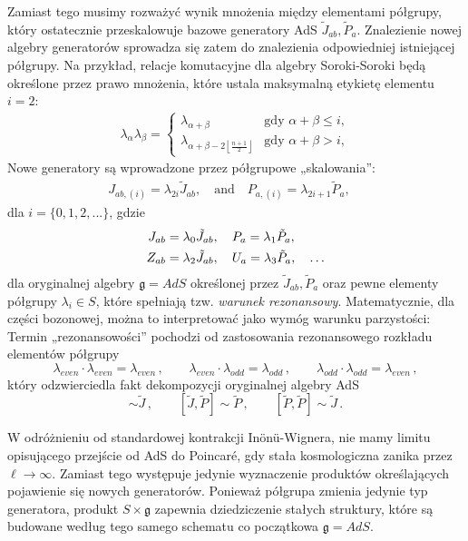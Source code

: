 \documentclass[12pt,a4paper]{article}
\begin{document}
Zamiast tego musimy rozważyć wynik mnożenia między elementami półgrupy, który ostatecznie przeskalowuje bazowe generatory AdS $\tilde{J}_{ab}, \tilde{P}_{a}$. Znalezienie nowej algebry generatorów sprowadza się zatem do znalezienia odpowiedniej istniejącej półgrupy. Na przykład, relacje komutacyjne dla algebry Soroki-Soroki \cite{Salgado:2013eut} będą określone przez prawo mnożenia, które ustala maksymalną etykietę elementu $i=2$:
\begin{align}\label{product_law}
	\lambda_\alpha \lambda_\beta =
	\begin{cases} 
		\lambda_{\alpha + \beta} & \text{gdy } \alpha + \beta \leq i, \\
		\lambda_{\alpha + \beta - 2 \left\lfloor \frac{n+1}{2} \right\rfloor} & \text{gdy } \alpha + \beta > i,
	\end{cases}
\end{align}
Nowe generatory są wprowadzone przez półgrupowe „skalowania”:
\begin{align}
	J_{ab,(i)}=\lambda_{2i}\tilde{J}_{ab},\quad\text{and}\quad P_{a,(i)}=\lambda_{2i+1}\tilde{P}_{a},\quad 
\end{align}
dla $i=\{0,1,2,...\}$, gdzie
\begin{align}
	J_{ab}&= \lambda_0\tilde{J}_{ab},\quad  P_{a}= \lambda_1\tilde{P}_a,\notag\\
	Z_{ab}&= \lambda_2 \tilde{J}_{ab},\quad U_{a}= \lambda_3\tilde{P}_a, \quad \dots 
\end{align}
dla oryginalnej algebry $\mathfrak{g}=AdS$ określonej przez $\tilde{J}_{ab},\tilde{P}_{a}$ oraz pewne elementy półgrupy $\lambda_i \in S$, które spełniają tzw. \textit{warunek rezonansowy}. Matematycznie, dla części bozonowej, można to interpretować jako wymóg warunku parzystości: Termin „rezonansowości” pochodzi od zastosowania rezonansowego rozkładu elementów półgrupy
\begin{equation}
	\lambda_{even}\cdot\lambda_{even}=\lambda_{even}\,, \qquad \lambda_{even}\cdot\lambda_{odd}=\lambda_{odd}\,, \qquad \lambda_{odd}\cdot\lambda_{odd}=\lambda_{even}\,, \label{Eq:lambdas_rules}  
\end{equation}
który odzwierciedla fakt dekompozycji oryginalnej algebry AdS
\begin{equation}
	[\tilde{J},\tilde{J}] \sim \tilde{J}\,, \qquad [\tilde{J},\tilde{P}] \sim \tilde{P}\,, \qquad [\tilde{P},\tilde{P}] \sim \tilde{J}\,. 
\end{equation}

W odróżnieniu od standardowej kontrakcji In\"{o}n\"{u}-Wignera, nie mamy limitu opisującego przejście od AdS do Poincar\'{e}, gdy stała kosmologiczna zanika przez $\ell \to \infty$. Zamiast tego występuje jedynie wyznaczenie produktów określających pojawienie się nowych generatorów. Ponieważ półgrupa zmienia jedynie typ generatora, produkt $S \times \mathfrak{g}$ zapewnia dziedziczenie stałych struktury, które są budowane według tego samego schematu co początkowa $\mathfrak{g}=AdS$.
\end{document}

